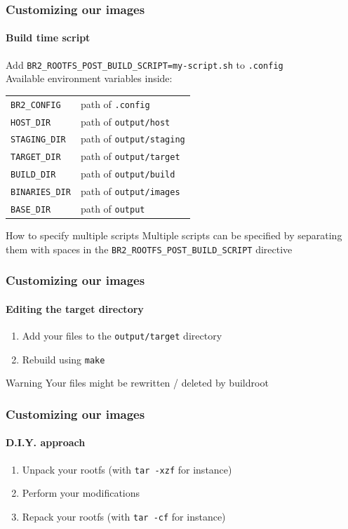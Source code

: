 \begin{frame}
  \frametitle{Customizing our images}
  \framesubtitle{Build time script}
  Add \texttt{BR2\_ROOTFS\_POST\_BUILD\_SCRIPT=my-script.sh} to \texttt{.config} \\
  Available environment variables inside:
  \begin{table}
    \begin{center}
      \begin{tabular}{ll}
        \texttt{BR2\_CONFIG} & path of \texttt{.config} \\
        \texttt{HOST\_DIR} & path of \texttt{output/host} \\
        \texttt{STAGING\_DIR} & path of \texttt{output/staging} \\
        \texttt{TARGET\_DIR} & path of \texttt{output/target} \\
        \texttt{BUILD\_DIR} & path of \texttt{output/build} \\
        \texttt{BINARIES\_DIR} & path of \texttt{output/images} \\
        \texttt{BASE\_DIR} & path of \texttt{output} \\
      \end{tabular}
    \end{center}
  \end{table}
  \begin{block}{How to specify multiple scripts}
    Multiple scripts can be specified by separating them with spaces in the \texttt{BR2\_ROOTFS\_POST\_BUILD\_SCRIPT} directive
  \end{block}
\end{frame}
\begin{frame}
  \frametitle{Customizing our images}
  \framesubtitle{Editing the target directory}
  \begin{enumerate}
    \item Add your files to the \texttt{output/target} directory
    \item Rebuild using \texttt{make}
  \end{enumerate}
  \begin{alertblock}{Warning}
    Your files might be rewritten / deleted by buildroot
  \end{alertblock}
\end{frame}
\begin{frame}
  \frametitle{Customizing our images}
  \framesubtitle{D.I.Y. approach}
  \begin{enumerate}
    \item Unpack your rootfs (with \texttt{tar -xzf} for instance)
    \item Perform your modifications
    \item Repack your rootfs (with \texttt{tar -cf} for instance)
  \end{enumerate}
\end{frame}
